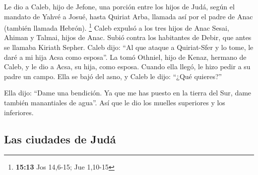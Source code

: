 \begin{paracol}{2}
 Le dio a Caleb, hijo de Jefone, una porción entre los
hijos de Judá, según el mandato de Yahvé a Josué, hasta Quiriat Arba,
llamada así por el padre de Anac (también llamada Hebrón). \footnote{\textbf{15:13}
  Jos 14,6-15; Jue 1,10-15}  Caleb expulsó a los tres
hijos de Anac Sesai, Ahiman y Talmai, hijos de Anac. 
Subió contra los habitantes de Debir, que antes se llamaba Kiriath
Sepher.  Caleb dijo: ``Al que ataque a Quiriat-Sfer y lo
tome, le daré a mi hija Acsa como esposa''.  La tomó
Othniel, hijo de Kenaz, hermano de Caleb, y le dio a Acsa, su hija, como
esposa.  Cuando ella llegó, le hizo pedir a su padre un
campo. Ella se bajó del asno, y Caleb le dijo: ``¿Qué quieres?''

 Ella dijo: ``Dame una bendición. Ya que me has puesto en
la tierra del Sur, dame también manantiales de agua''. Así que le dio
los muelles superiores y los inferiores.

\hypertarget{las-ciudades-de-juduxe1}{%
\subsection{Las ciudades de Judá}\label{las-ciudades-de-juduxe1}}


\end{paracol}
